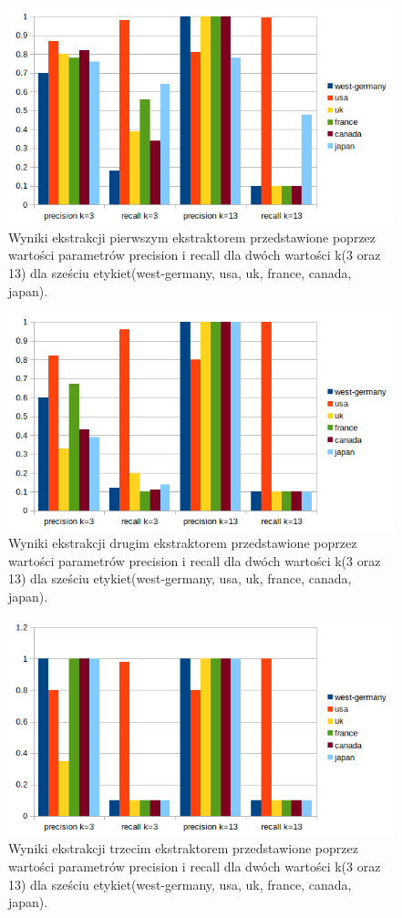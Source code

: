 \documentclass{classrep}
\begin{document}
\begin{figure}[H]
  \includegraphics[width=\linewidth]{wykresy/1ext2k6tag_precrec.png}
  \caption{Wyniki ekstrakcji pierwszym ekstraktorem przedstawione poprzez wartości parametrów precision i recall dla dwóch wartości k(3 oraz 13) dla sześciu etykiet(west-germany, usa, uk, france, canada, japan).}
  \label{fig:PLACES2}
\end{figure}
\begin{figure}[H]
  \includegraphics[width=\linewidth]{wykresy/2ext2k6tag_precrec.png}
  \caption{Wyniki ekstrakcji drugim ekstraktorem przedstawione poprzez wartości parametrów precision i recall dla dwóch wartości k(3 oraz 13) dla sześciu etykiet(west-germany, usa, uk, france, canada, japan).}
  \label{fig:PLACES3}
\end{figure}
\begin{figure}[H]
  \includegraphics[width=\linewidth]{wykresy/3ext2k6tah_precrec.png}
  \caption{Wyniki ekstrakcji trzecim ekstraktorem przedstawione poprzez wartości parametrów precision i recall dla dwóch wartości k(3 oraz 13) dla sześciu etykiet(west-germany, usa, uk, france, canada, japan).}
  \label{fig:PLACES4}
\end{figure}
\end{document}
